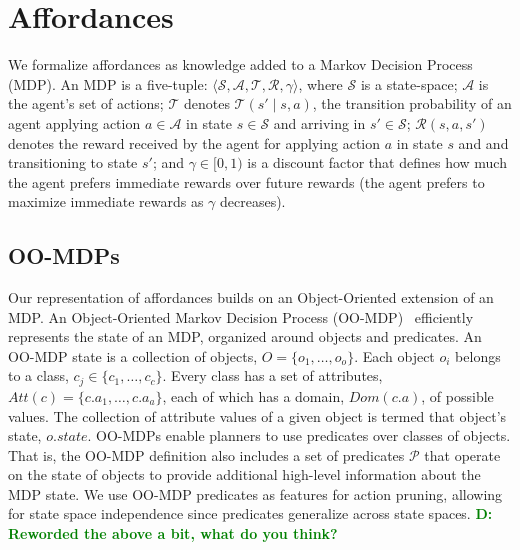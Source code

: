 \documentclass[conference]{IEEEtran}
\newcommand{\dnote}[1]{\textcolor{Green}{\textbf{D: #1}}}
\begin{document}

\section{Affordances}
\label{sec:affordances}

We formalize affordances as knowledge added to a Markov Decision Process
(MDP).  An MDP is a five-tuple: $\langle \mathcal{S}, \mathcal{A},
\mathcal{T}, \mathcal{R}, \gamma \rangle$, where $\mathcal{S}$ is a
state-space; $\mathcal{A}$ is the agent's set of actions;
$\mathcal{T}$ denotes $\mathcal{T}(s' \mid s,a)$, the transition
probability of an agent applying action $a \in \mathcal{A}$ in state
$s \in \mathcal{S}$ and arriving in $s' \in \mathcal{S}$;
$\mathcal{R}(s,a,s')$ denotes the reward received by the agent for
applying action $a$ in state $s$ and and transitioning to state $s'$;
and $\gamma \in [0, 1)$ is a discount factor that defines how much the
agent prefers immediate rewards over future rewards (the agent
prefers to maximize immediate rewards as $\gamma$ decreases).

\subsection{OO-MDPs}
Our representation of affordances builds on an Object-Oriented extension of an MDP.
An Object-Oriented Markov Decision Process (OO-MDP)~\citep{diuk08}
efficiently represents the state of an MDP, organized around objects
and predicates.  An OO-MDP state is a collection of
objects, $O = \{o_1, \ldots, o_o \}$.  Each object $o_i$ belongs to a
class, $c_j \in \{c_1, \ldots, c_c\}$. Every class has a set of
attributes, $Att(c) = \{c.a_1, \ldots, c.a_a \}$, each of which has a
domain, $Dom(c.a)$, of possible values. The collection of attribute
values of a given object is termed that object's state, $o.state$. OO-MDPs
enable planners to use predicates over classes of objects. That is, the OO-MDP
definition also includes a set of predicates $\mathcal{P}$ that operate
on the state of objects to provide additional high-level information
about the MDP state. We use OO-MDP predicates as features for action
pruning, allowing for state space independence since predicates
generalize across state spaces.
\dnote{Reworded the above a bit, what do you think?}
\end{document}
